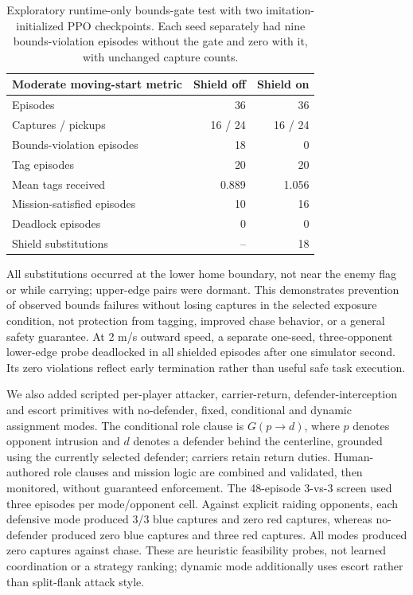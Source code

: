 \documentclass[letterpaper]{article}
\begin{document}
\begin{table}[htbp]
\centering
\small
\setlength{\tabcolsep}{3pt}
\begin{tabular}{lrr}
\hline
Moderate moving-start metric & Shield off & Shield on \\
\hline
Episodes & 36 & 36 \\
Captures / pickups & 16 / 24 & 16 / 24 \\
Bounds-violation episodes & 18 & 0 \\
Tag episodes & 20 & 20 \\
Mean tags received & 0.889 & 1.056 \\
Mission-satisfied episodes & 10 & 16 \\
Deadlock episodes & 0 & 0 \\
Shield substitutions & -- & 18 \\
\hline
\end{tabular}
\caption{Exploratory runtime-only bounds-gate test with two imitation-initialized PPO checkpoints. Each seed separately had nine bounds-violation episodes without the gate and zero with it, with unchanged capture counts.}
\label{tab:capable-shield}
\end{table}

All substitutions occurred at the lower home boundary, not near the enemy flag or while carrying; upper-edge pairs were dormant. This demonstrates prevention of observed bounds failures without losing captures in the selected exposure condition, not protection from tagging, improved chase behavior, or a general safety guarantee. At 2 m/s outward speed, a separate one-seed, three-opponent lower-edge probe deadlocked in all shielded episodes after one simulator second. Its zero violations reflect early termination rather than useful safe task execution.

We also added scripted per-player attacker, carrier-return, defender-interception and escort primitives with no-defender, fixed, conditional and dynamic assignment modes. The conditional role clause is $G(p\rightarrow d)$, where $p$ denotes opponent intrusion and $d$ denotes a defender behind the centerline, grounded using the currently selected defender; carriers retain return duties. Human-authored role clauses and mission logic are combined and validated, then monitored, without guaranteed enforcement. The 48-episode 3-vs-3 screen used three episodes per mode/opponent cell. Against explicit raiding opponents, each defensive mode produced 3/3 blue captures and zero red captures, whereas no-defender produced zero blue captures and three red captures. All modes produced zero captures against chase. These are heuristic feasibility probes, not learned coordination or a strategy ranking; dynamic mode additionally uses escort rather than split-flank attack style.
\end{document}
